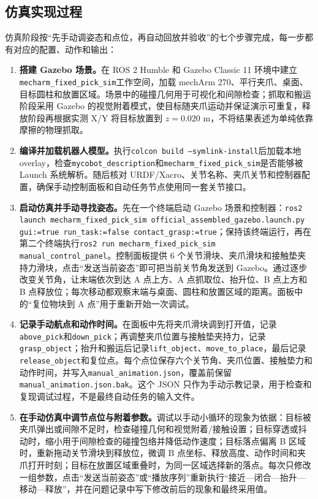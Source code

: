 \documentclass[UTF8,11pt,a4paper]{ctexart}
\newcommand{\code}[1]{\texttt{\footnotesize #1}}\newcommand{\resultbox}[1]{\begin{center}\fcolorbox{Navy}{Sky}{\parbox{0.93\textwidth}{\small #1}}\end{center}}
\begin{document}
\subsection{仿真实现过程}
仿真阶段按“先手动调姿态和点位，再自动回放并验收”的七个步骤完成，每一步都有对应的配置、动作和输出：
\begin{enumerate}
\item \textbf{搭建 Gazebo 场景。}在 ROS 2 Humble 和 Gazebo Classic 11 环境中建立\code{mecharm\_fixed\_pick\_sim}工作空间，加载 mechArm 270、平行夹爪、桌面、目标圆柱和放置区域。场景中的碰撞几何用于可视化和间隙检查；抓取和搬运阶段采用 Gazebo 的视觉附着模式，使目标随夹爪运动并保证演示可重复，释放阶段再根据实测 X/Y 将目标放置到 $z=0.020$ m，不将结果表述为单纯依靠摩擦的物理抓取。
\item \textbf{编译并加载机器人模型。}执行\code{colcon build --symlink-install}后加载本地 overlay，检查\code{mycobot\_description}和\code{mecharm\_fixed\_pick\_sim}是否能够被 Launch 系统解析。随后核对 URDF/Xacro、关节名称、夹爪关节和控制器配置，确保手动控制面板和自动任务节点使用同一套关节接口。
\item \textbf{启动仿真并手动寻找姿态。}先在一个终端启动 Gazebo 场景和控制器：\code{ros2 launch mecharm\_fixed\_pick\_sim official\_assembled\_gazebo.launch.py gui:=true run\_task:=false contact\_grasp:=true}；保持该终端运行，再在第二个终端执行\code{ros2 run mecharm\_fixed\_pick\_sim manual\_control\_panel}。控制面板提供 6 个关节滑块、夹爪滑块和接触垫夹持力滑块，点击“发送当前姿态”即可把当前关节角发送到 Gazebo。通过逐步改变关节角，让末端依次到达 A 点上方、A 点抓取位、抬升位、B 点上方和 B 点释放位；每次移动都观察末端与桌面、圆柱和放置区域的距离。面板中的“复位物块到 A 点”用于重新开始一次调试。
\item \textbf{记录手动航点和动作时间。}在面板中先将夹爪滑块调到打开值，记录\code{above\_pick}和\code{down\_pick}；再调整夹爪位置与接触垫夹持力，记录\code{grasp\_object}；抬升和搬运后记录\code{lift\_object}、\code{move\_to\_place}，最后记录\code{release\_object}和复位点。每个点位保存六个关节角、夹爪位置、接触垫力和动作时间，并写入\code{manual\_animation.json}，覆盖前保留\code{manual\_animation.json.bak}。这个 JSON 只作为手动示教记录，用于检查和复现调试过程，不是最终自动任务的输入文件。
\item \textbf{在手动仿真中调节点位与附着参数。}调试以手动小循环的现象为依据：目标被夹爪弹出或间隙不足时，检查碰撞几何和视觉附着/接触设置；目标穿透或抖动时，缩小用于间隙检查的碰撞包络并降低动作速度；目标落点偏离 B 区域时，重新拖动关节滑块到释放位，微调 B 点坐标、释放高度、动作时间和夹爪打开时刻；目标在放置区域重叠时，为同一区域选择新的落点。每次只修改一组参数，点击“发送当前姿态”或“播放序列”重新执行“接近—闭合—抬升—移动—释放”，并在问题记录中写下修改前后的现象和最终采用值。

\end{enumerate}
\end{document}
